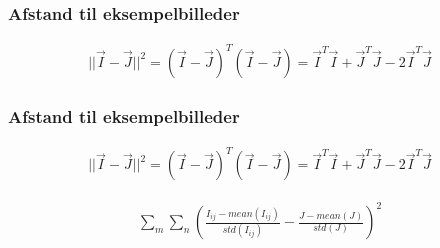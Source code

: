 \begin{frame}
\frametitle{Afstand til eksempelbilleder}
\begin{align*}
	||\vec{I}-\vec{J}||^2 = (\vec{I}-\vec{J})^T(\vec{I}-\vec{J}) = \vec{I}^T\vec{I} + \vec{J}^T\vec{J}-2\vec{I}^T\vec{J}
\end{align*}
\end{frame}

\begin{frame}
\frametitle{Afstand til eksempelbilleder}
\begin{align*}
	||\vec{I}-\vec{J}||^2 = (\vec{I}-\vec{J})^T(\vec{I}-\vec{J}) = \vec{I}^T\vec{I} + \vec{J}^T\vec{J}-2\vec{I}^T\vec{J}
\end{align*}

\begin{align*}
	\sum_m\sum_n \left(\frac{I_{ij}-mean(I_{ij})}{std(I_{ij})}-\frac{J-mean(J)}{std(J)}\right)^2
\end{align*}
\end{frame}